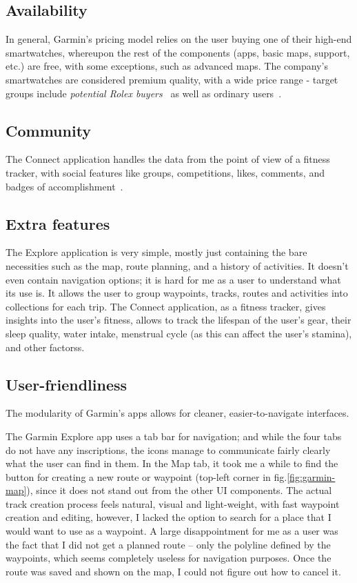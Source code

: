 \subsection*{Availability}
In general, Garmin's pricing model relies on the user buying one of their high-end smartwatches, whereupon the rest of the components (apps, basic maps, support, etc.) are free, with some exceptions, such as advanced maps. 
The company's smartwatches are considered premium quality, with a wide price range - target groups include \textit{potential Rolex buyers}~\cite{garmin-expensive} as well as ordinary users~\cite{garmin-watches-review}.
\subsection*{Community}
The Connect application handles the data from the point of view of a fitness tracker, with social features like groups, competitions, likes, comments, and badges of accomplishment~\cite{garmin-connect}.
\subsection*{Extra features}
The Explore application is very simple, mostly just containing the bare necessities such as the map, route planning, and a history of activities.
It doesn't even contain navigation options; it is hard for me as a user to understand what its use is.
It allows the user to group waypoints, tracks, routes and activities into collections for each trip.
The Connect application, as a fitness tracker, gives insights into the user's fitness, allows to track the lifespan of the user's gear, their sleep quality, water intake, menstrual cycle (as this can affect the user's stamina), and other factorss.
\subsection*{User-friendliness}
The modularity of Garmin's apps allows for cleaner, easier-to-navigate interfaces.

The Garmin Explore app uses a tab bar for navigation; and while the four tabs do not have any inscriptions, the icons manage to communicate fairly clearly what the user can find in them.
In the Map tab, it took me a while to find the button for creating a new route or waypoint (top-left corner in fig.\ref{fig:garmin-map}), since it does not stand out from the other UI components.
The actual track creation process feels natural, visual and light-weight, with fast waypoint creation and editing, however, I lacked the option to search for a place that I would want to use as a waypoint.
A large disappointment for me as a user was the fact that I did not get a planned route -- only the polyline defined by the waypoints, which seems completely useless for navigation purposes.
Once the route was saved and shown on the map, I could not figure out how to cancel it.

